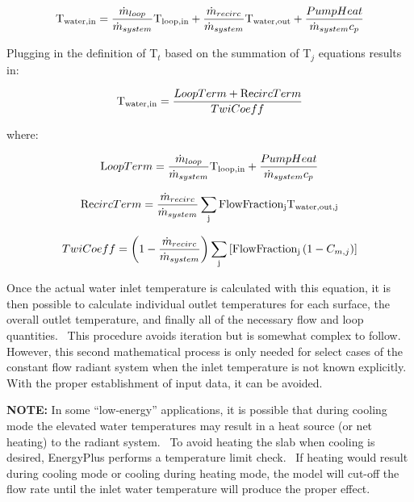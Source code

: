 \begin{equation}
{{\rm{T}}_{{\rm{water,in}}}} = \frac{{{{\dot m}_{loop}}}}{{{{\dot m}_{system}}}}{{\rm{T}}_{{\rm{loop,in}}}} + \frac{{{{\dot m}_{recirc}}}}{{{{\dot m}_{system}}}}{{\rm{T}}_{{\rm{water,out}}}} + \frac{{PumpHeat}}{{{{\dot m}_{system}}{c_p}}}
\end{equation}

Plugging in the definition of T\(_{t}\) based on the summation of T\(_{j}\) equations results in:

\begin{equation}
{{\rm{T}}_{{\rm{water,in}}}} = \frac{{LoopTerm + {\mathop{\rm Re}\nolimits} circTerm}}{{TwiCoeff}}
\end{equation}

where:

\begin{equation}
{\rm{L}}oopTerm = \frac{{{{\dot m}_{loop}}}}{{{{\dot m}_{system}}}}{{\rm{T}}_{{\rm{loop,in}}}} + \frac{{PumpHeat}}{{{{\dot m}_{system}}{c_p}}}
\end{equation}

\begin{equation}
{\mathop{\rm Re}\nolimits} circTerm = \frac{{{{\dot m}_{recirc}}}}{{{{\dot m}_{system}}}}\sum\limits_{\rm{j}} {{\rm{FlowFractio}}{{\rm{n}}_{\rm{j}}}{{\rm{T}}_{{\rm{water,out,j}}}}}
\end{equation}

\begin{equation}
TwiCoeff = \left( {1 - \frac{{{{\dot m}_{recirc}}}}{{{{\dot m}_{system}}}}} \right)\sum\limits_{\rm{j}} {\left[ {{\rm{FlowFractio}}{{\rm{n}}_{\rm{j}}}\left( {1 - {C_{m,j}}} \right)} \right]}
\end{equation}

Once the actual water inlet temperature is calculated with this equation, it is then possible to calculate individual outlet temperatures for each surface, the overall outlet temperature, and finally all of the necessary flow and loop quantities.~ This procedure avoids iteration but is somewhat complex to follow.~ However, this second mathematical process is only needed for select cases of the constant flow radiant system when the inlet temperature is not known explicitly.~ With the proper establishment of input data, it can be avoided.

\textbf{NOTE:} In some ``low-energy'' applications, it is possible that during cooling mode the elevated water temperatures may result in a heat source (or net heating) to the radiant system.~ To avoid heating the slab when cooling is desired, EnergyPlus performs a temperature limit check.~ If heating would result during cooling mode or cooling during heating mode, the model will cut-off the flow rate until the inlet water temperature will produce the proper effect.

